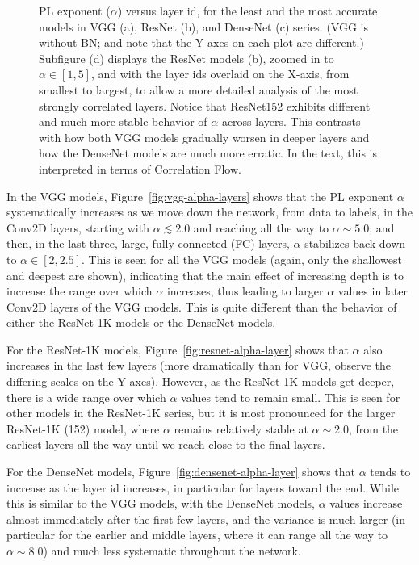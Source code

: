 \begin{figure}[t]
{        \label{fig:resnet_alpha_overlaid_depth}
    }
    \caption{PL exponent ($\alpha$) versus layer id, for the least and the most accurate models in VGG (a), ResNet (b), and DenseNet (c) series. 
             (VGG is without BN; and note that the Y axes on each plot are different.)  
             Subfigure (d) displays the ResNet models (b), zoomed in to $\alpha\in[1,5]$, and with the layer ids overlaid on the X-axis, from smallest to largest, to
             allow a more detailed analysis of the most strongly correlated layers.
             Notice that ResNet152 exhibits different and much more stable behavior of $\alpha$ across layers.
             This contrasts with how both VGG models gradually worsen in deeper layers and how the DenseNet models are much more erratic.  
             In the text, this is interpreted in terms of Correlation Flow.
            }
    \label{fig:3models-alpha-layers}
\end{figure}

In the VGG models, Figure~\ref{fig:vgg-alpha-layers} shows that the PL exponent $\alpha$ systematically increases as we move down the network, from data to labels, in the Conv2D layers, starting with $\alpha\lesssim 2.0$ and reaching all the way to $\alpha\sim 5.0$; and then, in the last three, large, fully-connected (FC) layers, $\alpha$ stabilizes back down to $\alpha\in[2,2.5]$.
This is seen for all the VGG models (again, only the shallowest and deepest are shown), indicating that the main effect of increasing depth is to increase the range over which $\alpha$ increases, thus leading to larger $\alpha$ values in later Conv2D layers of the VGG models.
This is quite different than the behavior of either the ResNet-1K models or the DenseNet models.

For the ResNet-1K models, Figure~\ref{fig:resnet-alpha-layer} shows that $\alpha$ also increases in the last few layers (more dramatically than for VGG, observe the differing scales on the Y axes).
However, as the ResNet-1K models get deeper, there is a wide range over which $\alpha$ values tend to remain small.
This is seen for other models in the ResNet-1K series, but it is most pronounced for the larger ResNet-1K (152) model, where $\alpha$ remains relatively stable at $\alpha\sim 2.0$, from the earliest layers all the way until we reach close to the final layers.  

For the DenseNet models, Figure~\ref{fig:densenet-alpha-layer} shows that $\alpha$ tends to increase as the layer id increases, in particular for layers toward the end.
While this is similar to the VGG models, with the DenseNet models, $\alpha$ values increase almost immediately after the first few layers, and the variance is much larger (in particular for the earlier and middle layers, where it can range all the way to $\alpha\sim 8.0$) and much less systematic throughout the network.

